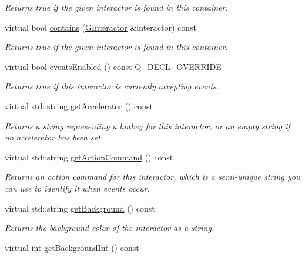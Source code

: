 \begin{DoxyCompactItemize}
\begin{DoxyCompactList}\small\item\em Returns true if the given interactor is found in this container. \end{DoxyCompactList}\item 
virtual bool \mbox{\hyperlink{classGContainer_a62fe1c67f06f657fea8b9b28672516a0}{contains}} (\mbox{\hyperlink{classGInteractor}{G\+Interactor}} \&interactor) const
\begin{DoxyCompactList}\small\item\em Returns true if the given interactor is found in this container. \end{DoxyCompactList}\item 
virtual bool \mbox{\hyperlink{classGInteractor_ac05ba5b92e2e5146d416fe7f842a0969}{events\+Enabled}} () const Q\+\_\+\+D\+E\+C\+L\+\_\+\+O\+V\+E\+R\+R\+I\+DE
\begin{DoxyCompactList}\small\item\em Returns true if this interactor is currently accepting events. \end{DoxyCompactList}\item 
virtual std\+::string \mbox{\hyperlink{classGInteractor_a69f8d23ed8f207fbecad99960776e942}{get\+Accelerator}} () const
\begin{DoxyCompactList}\small\item\em Returns a string representing a hotkey for this interactor, or an empty string if no accelerator has been set. \end{DoxyCompactList}\item 
virtual std\+::string \mbox{\hyperlink{classGInteractor_a94eb4276000c4fdfb508ce9e6317a82a}{get\+Action\+Command}} () const
\begin{DoxyCompactList}\small\item\em Returns an action command for this interactor, which is a semi-\/unique string you can use to identify it when events occur. \end{DoxyCompactList}\item 
virtual std\+::string \mbox{\hyperlink{classGInteractor_a808e22cc1fdfbecf71ed8c64ef4600e0}{get\+Background}} () const
\begin{DoxyCompactList}\small\item\em Returns the background color of the interactor as a string. \end{DoxyCompactList}\item 
virtual int \mbox{\hyperlink{classGInteractor_a9e827257a55cb8cf4d9de2ec6bcfd7a0}{get\+Background\+Int}} () const

\end{DoxyCompactItemize}
